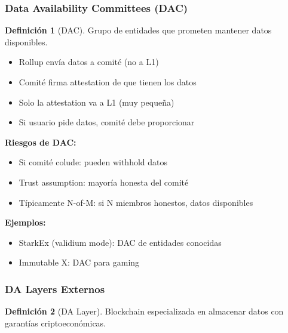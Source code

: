 \documentclass[11pt,a4paper,twoside,openright]{book}
\theoremstyle{definition}
\newtheorem{definition}{Definición}[chapter]
\theoremstyle{plain}
\theoremstyle{remark}
\begin{document}
\subsubsection{Data Availability Committees (DAC)}

\begin{definition}[DAC]
Grupo de entidades que prometen mantener datos disponibles.
\end{definition}

\begin{itemize}
    \item Rollup envía datos a comité (no a L1)
    \item Comité firma attestation de que tienen los datos
    \item Solo la attestation va a L1 (muy pequeña)
    \item Si usuario pide datos, comité debe proporcionar
\end{itemize}

\begin{advertencia}
\textbf{Riesgos de DAC:}

\begin{itemize}
    \item Si comité colude: pueden withhold datos
    \item Trust assumption: mayoría honesta del comité
    \item Típicamente N-of-M: si N miembros honestos, datos disponibles
\end{itemize}

\textbf{Ejemplos:}
\begin{itemize}
    \item StarkEx (validium mode): DAC de entidades conocidas
    \item Immutable X: DAC para gaming
\end{itemize}
\end{advertencia}

\subsubsection{DA Layers Externos}

\begin{definition}[DA Layer]
Blockchain especializada en almacenar datos con garantías criptoeconómicas.
\end{definition}
\end{document}
